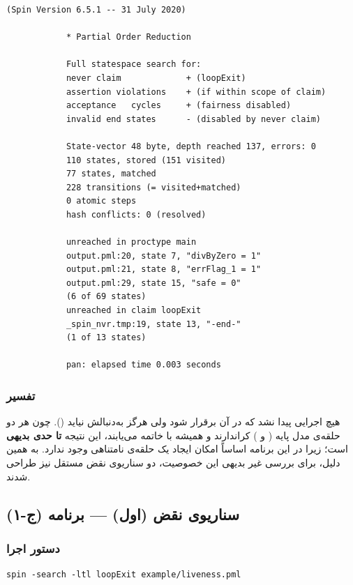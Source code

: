 \documentclass[12pt]{report}
\begin{document}
	\begin{latin}
		\begin{lstlisting}[style=termstyle]
			(Spin Version 6.5.1 -- 31 July 2020)
			
			* Partial Order Reduction
			
			Full statespace search for:
			never claim             + (loopExit)
			assertion violations    + (if within scope of claim)
			acceptance   cycles     + (fairness disabled)
			invalid end states      - (disabled by never claim)
			
			State-vector 48 byte, depth reached 137, errors: 0
			110 states, stored (151 visited)
			77 states, matched
			228 transitions (= visited+matched)
			0 atomic steps
			hash conflicts: 0 (resolved)
			
			unreached in proctype main
			output.pml:20, state 7, "divByZero = 1"
			output.pml:21, state 8, "errFlag_1 = 1"
			output.pml:29, state 15, "safe = 0"
			(6 of 69 states)
			unreached in claim loopExit
			_spin_nvr.tmp:19, state 13, "-end-"
			(1 of 13 states)
			
			pan: elapsed time 0.003 seconds
		\end{lstlisting}
	\end{latin}
	
	\subsubsection{تفسیر}
	
	هیچ اجرایی پیدا نشد که در آن  برقرار شود ولی  هرگز به‌دنبالش نیاید (). چون هر دو حلقه‌ی مدل پایه ( و ) کراندارند و همیشه با  خاتمه می‌یابند، این نتیجه \textbf{تا حدی بدیهی} است؛ زیرا در این برنامه اساساً امکان ایجاد یک حلقه‌ی نامتناهی وجود ندارد. به همین دلیل، برای بررسی غیر بدیهی این خصوصیت، دو سناریوی نقض مستقل نیز طراحی شدند.
	
	\subsection{سناریوی نقض (اول) --- برنامه (ج-۱)}
	
	\subsubsection{دستور اجرا}
	
	\begin{latin}
		\begin{lstlisting}[style=codestyle]
			spin -search -ltl loopExit example/liveness.pml
		\end{lstlisting}
	\end{latin}
	
\end{document}
